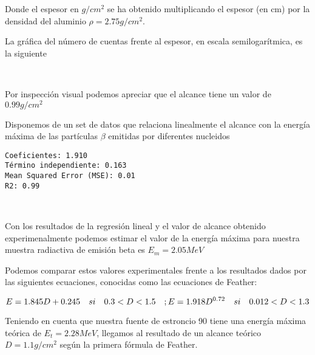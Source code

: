 \documentclass[11pt]{article}
\begin{document}
    Donde el espesor en \(g/cm^2\) se ha obtenido multiplicando el espesor
(en cm) por la densidad del aluminio \(\rho = 2.75 g/cm^2\).

La gráfica del número de cuentas frente al espesor, en escala
semilogarítmica, es la siguiente

    \begin{center}
    \end{center}
    { \hspace*{\fill} \\}
     
            
    
    Por inspección visual podemos apreciar que el alcance tiene un valor de
\(0.99g/cm^2\)

    

    Disponemos de un set de datos que relaciona linealmente el alcance con
la energía máxima de las partículas \(\beta\) emitidas por diferentes
nucleidos

    \begin{Verbatim}[commandchars=\\\{\}]
Coeficientes: 1.910
Término independiente: 0.163
Mean Squared Error (MSE): 0.01
R2: 0.99
    \end{Verbatim}

    \begin{center}
    \end{center}
    { \hspace*{\fill} \\}
     
            
    
    Con los resultados de la regresión lineal y el valor de alcance obtenido
experimenalmente podemos estimar el valor de la energía máxima para
nuestra muestra radiactiva de emisión beta es \(E_m = 2.05MeV\)

    

    Podemos comparar estos valores experimentales frente a los resultados
dados por las siguientes ecuaciones, conocidas como las ecuaciones de
Feather:

\[
E = 1.845D + 0.245 \quad si \quad 0.3<D<1.5 \quad ;  \quad \\
E = 1.918D^{0.72} \quad si \quad 0.012<D<1.3
\]
 
            
    
    Teniendo en cuenta que nuestra fuente de estroncio 90 tiene una energía
máxima teórica de \(E_t = 2.28 MeV\), llegamos al resultado de un
alcance teórico \(D = 1.1g/cm^2\) según la primera fórmula de Feather.
\end{document}
